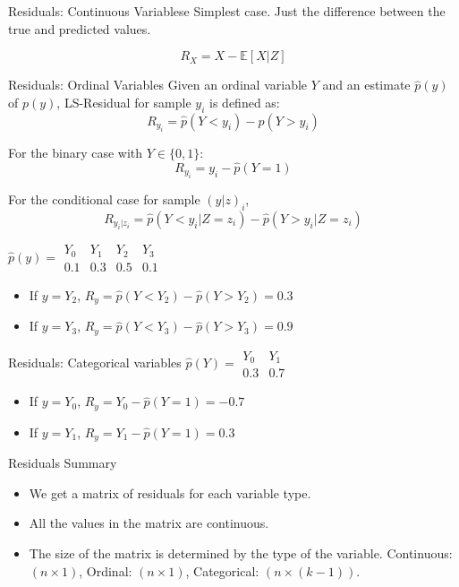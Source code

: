 \documentclass{beamer}
\begin{document}
\begin{frame}{Residuals: Continuous Variablese}
	Simplest case. Just the difference between the true and predicted values.

	$$ R_X = X - \mathbb{E}[X | Z] $$

\end{frame}

\begin{frame}{Residuals: Ordinal Variables}
	Given an ordinal variable $ Y $ and an estimate $ \hat{p}(y) $ of $
	p(y) $, LS-Residual for sample $ y_i $ is defined as:
	$$ R_{y_i} = \hat{p}(Y < y_i) - \hat{p}(Y > y_i) $$
	\vspace{1em}

	For the binary case with $ Y \in \{0, 1\} $:
	$$ R_{y_i} = y_i - \hat{p}(Y = 1) $$
	\vspace{1em}

	For the conditional case for sample $ (y|z)_i $,
	$$ R_{y_i | z_i} = \hat{p}(Y < y_i | Z=z_i) - \hat{p}(Y>y_i|Z=z_i) $$

	$ \hat{p}(y) = \begin{array}{llll} Y_0 & Y_1 & Y_2 & Y_3 \\ 0.1 & 0.3 & 0.5 & 0.1 \end{array} $
	\begin{itemize}
		\item If $ y = Y_2 $, $ R_{y} = \hat{p}(Y < Y_2) - \hat{p}(Y > Y_2) = 0.3 $
		\item If $ y = Y_3 $, $ R_{y} = \hat{p}(Y < Y_3) - \hat{p}(Y > Y_3) = 0.9 $
	\end{itemize}
\end{frame}

\begin{frame}{Residuals: Categorical variables}
	$\hat{p}(Y) = \begin{array}{ll} Y_0 & Y_1 \\ 0.3 & 0.7 \end{array} $
	\begin{itemize}	
		\item If $ y = Y_0 $, $ R_{y} = Y_0 - \hat{p}(Y=1) = -0.7 $
		\item If $ y = Y_1 $, $ R_{y} = Y_1 - \hat{p}(Y=1) = 0.3 $
	\end{itemize}
\end{frame}

\begin{frame}{Residuals Summary}
	\begin{itemize}
		\item We get a matrix of residuals for each variable type.
		\item All the values in the matrix are continuous.
		\item The size of the matrix is determined by the type of the variable.
			Continuous: $ (n \times 1) $, Ordinal: $ (n \times 1 ) $, Categorical: $ (n \times (k-1)) $.
	\end{itemize}
\end{frame}
\end{document}
